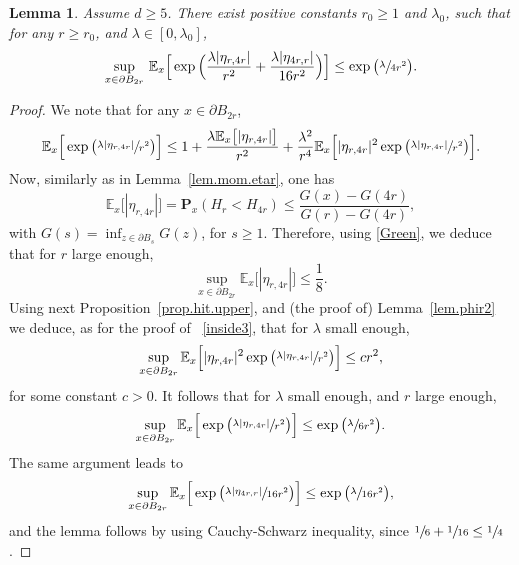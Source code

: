 \documentclass[JEP,XML,SOM,Unicode,NoFloatCountersInSection,published]{cedram}
\theoremstyle{plain}
\newtheorem{lemma}[theorem]{Lemma}
\theoremstyle{definition}
\newcommand{\1}{{\text{\Large $\mathfrak 1$}}}
\begin{document}
\begin{lemma}\label{lem.phir3}
Assume $d\ge 5$.
There exist positive constants $r_0\ge 1$ and $\lambda_0$, such that for any $r\ge r_0$, and $\lambda\in[0,\lambda_0]$,
\[
\sup_{x\in \partial B_{2r}} \, \mathbb E_x \Big[\exp\Big(\frac{\lambda |\eta_{r,4r}|}{r^2} + \frac{\lambda |\eta_{4r,r}|}{16r^2}\Big)\Big]
\le \exp\big(\sfrac{\lambda}{4r^2}\big).
\]
\end{lemma}
\begin{proof}

We note that for any $x\in \partial B_{2r}$,
\[
\mathbb E_x\Big[\exp\big(\sfrac{\lambda |\eta_{r,4r}|}{r^2}\big)\Big] \le 1+ \frac{\lambda \mathbb E_x\big[|\eta_{r,4r}|\big]}{r^2} +
\frac{\lambda^2}{r^4} \mathbb E_x\Big[|\eta_{r,4r}|^2\exp\big(\sfrac{\lambda |\eta_{r,4r}|}{r^2}\big)\Big].
\]
Now, similarly as in Lemma~\ref{lem.mom.etar}, one has
\[
\mathbb E_x\big[|\eta_{r,4r}|\big] = \mathbf P_x(H_r<H_{4r}) \le \frac{G(x) - G(4r)}{G(r)- G(4r)},
\]
with $G(s)= \inf_{z\in \partial B_s} G(z)$, for $s\ge 1$. Therefore, using \eqref{Green}, we deduce that for $r$ large enough,
\[
\sup_{x\in \partial B_{2r}} \mathbb E_x\big[|\eta_{r,4r}|\big] \le \frac{1}{8}.
\]
Using next Proposition~\ref{prop.hit.upper}, and (the proof of) Lemma~\ref{lem.phir2} we deduce, as for the proof of ~\eqref{inside3}, that for $\lambda$ small enough,
\[
\sup_{x\in \partial B_{2r}} \mathbb E_x\Big[|\eta_{r,4r}|^2\exp\big(\sfrac{\lambda |\eta_{r,4r}|}{r^2}\big)\Big] \le c r^2,
\]
for some constant $c>0$. It follows that for $\lambda$ small enough, and $r$ large enough,
\[
\sup_{x\in \partial B_{2r}} \mathbb E_x\Big[\exp\big(\sfrac{\lambda |\eta_{r,4r}|}{r^2}\big)\Big] \le \exp\big(\sfrac{\lambda}{6r^2}\big).
\]
The same argument leads to
\[
\sup_{x\in \partial B_{2r}} \mathbb E_x\Big[\exp\big(\sfrac{\lambda |\eta_{4r,r}|}{16r^2}\big)\Big] \le \exp\big(\sfrac{\lambda}{16r^2}\big),
\]
and the lemma follows by using Cauchy-Schwarz inequality, since $\sfrac{1}{6} + \sfrac{1}{16} \le \sfrac 14$.
\end{proof}
\end{document}
